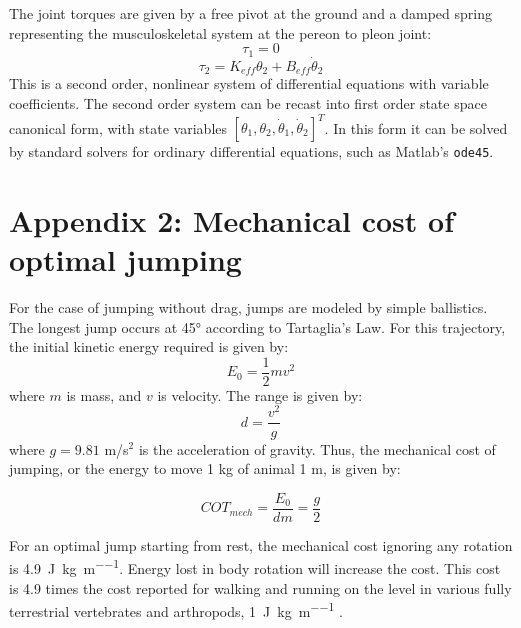 \documentclass{article}
\begin{document}
The joint torques are given by a free pivot at the ground and a damped spring representing the musculoskeletal system at the pereon to pleon joint:
\begin{equation}
\tau_1 = 0
\end{equation}
\begin{equation}
\tau_2 = K_{eff} \theta_2 + B_{eff} \dot{\theta}_2
\end{equation}
This is a second order, nonlinear system of differential equations with variable coefficients.  The second order system can be recast into first order state space canonical form, with state variables $[\theta_1, \theta_2, \dot\theta_1, \dot\theta_2]^T$.  In this form it can be solved by standard solvers for ordinary differential equations, such as Matlab's {\tt ode45}.   

\section*{Appendix 2: Mechanical cost of optimal jumping}
For the case of jumping without drag, jumps are modeled by simple ballistics.  The longest jump occurs at \ang{45} according to Tartaglia's Law.  For this trajectory, the initial kinetic energy required is given by:
\begin{equation}
E_0 = \frac{1}{2} m v^2
\end{equation}
where $m$ is mass, and $v$ is velocity.  The range is given by:
\begin{equation}
d = \frac{v^2}{g}
\end{equation}
where  $g = 9.81$ m/s$^2$ is the acceleration of gravity.  Thus, the mechanical cost of jumping, or the energy to move 1 kg of animal 1 m, is given by:

\begin{equation}
COT_{mech} = \frac{E_0}{dm} = \frac{g}{2}
\end{equation}

For an optimal jump starting from rest, the mechanical cost ignoring any rotation is \SI{4.9}{\joule\per\kilo\gram\per\meter}.  Energy lost in body rotation will increase the cost.  This cost is 4.9 times the cost reported for walking and running on the level in various fully terrestrial vertebrates and arthropods, \SI{1}{\joule\per\kilo\gram\per\meter} \citep{Full:2001}. 
\end{document}

